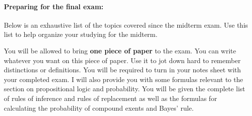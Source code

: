 \documentclass[10pt,landscape]{article}
\begin{document}
\paragraph{Preparing for the final exam:} Below is an exhaustive list of the topics covered since the midterm exam.  Use this list to help organize your studying for the midterm.

\vspace{3mm}

You will be allowed to bring \textbf{one piece of paper} to the exam.  You can write whatever you want on this piece of paper.  Use it to jot down hard to remember distinctions or definitions.  You will be required to turn in your notes sheet with your completed exam. I will also provide you with some formulas relevant to the section on propositional logic and probability.  You will be given the complete list of rules of inference and rules of replacement as well as the formulas for calculating the probability of compound exents and Bayes' rule.

\hrulefill
\end{document}
